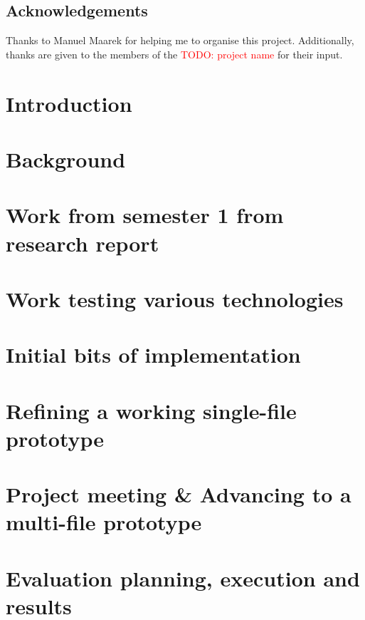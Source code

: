 \documentclass[a4paper,11pt]{report}
\newcommand{\todo}[1]{\textcolor{red}{TODO: #1}}
\begin{document}
\vfill

\section*{Acknowledgements}
Thanks to Manuel Maarek for helping me to organise this project. Additionally, thanks are given to the members of the \todo{project name} for their input.

\newpage

\pagestyle{headings}



\chapter{Introduction}


\chapter{Background}


\chapter{Work from semester 1 from research report}
\chapter{Work testing various technologies}
\chapter{Initial bits of implementation}
\chapter{Refining a working single-file prototype}
\chapter{Project meeting \& Advancing to a multi-file prototype}
\chapter{Evaluation planning, execution and results}
\end{document}
